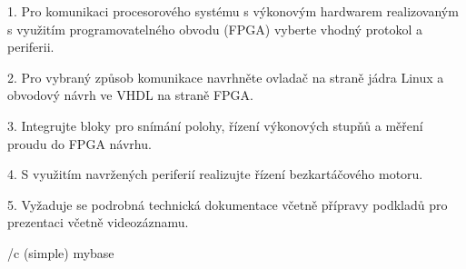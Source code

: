 1. Pro komunikaci procesorového systému s výkonovým hardwarem realizovaným s využitím programovatelného obvodu (FPGA) vyberte vhodný protokol a periferii.

2. Pro vybraný způsob komunikace navrhněte ovladač na straně jádra Linux a obvodový návrh ve VHDL na straně FPGA.

3. Integrujte bloky pro snímání polohy, řízení výkonových stupňů a měření proudu do FPGA návrhu.

4. S využitím navržených periferií realizujte řízení bezkartáčového motoru.

5. Vyžaduje se podrobná technická dokumentace včetně přípravy podkladů pro prezentaci včetně videozáznamu.

 \bibchap
 \usebib/c (simple) mybase
 
 
 
 \bye
  
 